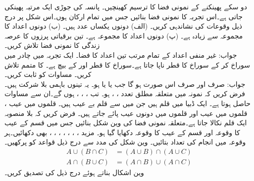 \quad
دو سکے پھینکنے کے نمونی فضا کا ترسیم کھینچیں۔
\quad
پانسہ کی جوڑی ایک مرتبہ پھینکی جاتی ہے۔اس تجربہ کا نمونی فضا بنائیں جس میں تمام ارکان ہوں۔اس شکل پر درج ذیل وقوعات کی نشاندہی کریں۔
(الف) دونوں یکساں عدد ہیں۔ (ب) دونوں اعداد کا مجموعہ  سے زیادہ ہے۔ (پ) دونوں اعداد کا مجموعہ  ہے۔
\quad
تین برقیاتی پرزوں کا عرصہ زندگی کا نمونی فضا تلاش کریں۔\\
جواب:\quad
غیر منفی اعداد کے تمام مرتب تین اعداد کا فضا۔ 
\quad
ایک تجربہ میں چادر میں سوراخ کر کے سوراخ کا قطر ناپا جاتا ہے۔سوراخ  کا قطر  اور  کے بیچ ہے۔ کا متمم تلاش کریں۔
\quad
مساوات  کو ثابت کریں۔\\
جواب:\quad
{} صرف اور صرف اس صورت ہو گا جب  یا  یا   ہو۔ یہ تینوں باہمی بلا شرکت ہیں۔فرض کریں کہ نمونہ میں متعلقہ مطلق تعدد ، ،  ہو۔ تب ، ، ،  ہوں گے۔ان سے مساوات  حاصل ہوتا ہے۔
\quad
ایک ڈبیا میں  قلم ہیں جن میں سے  قلم بے عیب ہیں۔ قلموں میں عیب ،  قلموں میں عیب  اور  قلموں میں دونوں عیب پائے جاتے ہیں۔ فرض کریں کہ بلا منصوبہ ایک قلم نکالا جاتا ہے۔متعلقہ نمونی فضا  کی وین شکل بنائیں جس میں  قسم کے عیب کا وقوعہ  اور   قسم کے عیب کا وقوعہ  دکھایا گیا ہو۔ مزید ، ، ، ، ، ، ،  بھی دکھائیں۔ہر وقوعہ میں انجام کی تعداد بتائیں۔
\quad
وین شکل کی مدد سے درج ذیل قواعد کو پرکھیں۔
\begin{align*}
A\cup (B\cap C)&=(A\cup B) \cap (A\cup C)\\
A\cap (B\cup C)&=(A\cap B)\cup (A\cap C)
\end{align*}
\quad {} \quad 
وین اشکال بناتے ہوئے درج ذیل  کی تصدیق کریں۔
